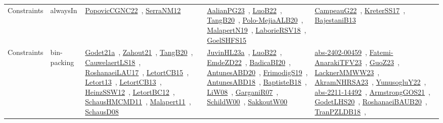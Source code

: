 {\begin{longtable}{lp{3cm}>{\raggedright\arraybackslash}p{6cm}>{\raggedright\arraybackslash}p{6cm}>{\raggedright\arraybackslash}p{8cm}}
Constraints & alwaysIn & \href{../works/PopovicCGNC22.pdf}{PopovicCGNC22}~\cite{PopovicCGNC22}, \href{../works/SerraNM12.pdf}{SerraNM12}~\cite{SerraNM12} & \href{../works/AalianPG23.pdf}{AalianPG23}~\cite{AalianPG23}, \href{../works/LuoB22.pdf}{LuoB22}~\cite{LuoB22}, \href{../works/TangB20.pdf}{TangB20}~\cite{TangB20}, \href{../works/Polo-MejiaALB20.pdf}{Polo-MejiaALB20}~\cite{Polo-MejiaALB20}, \href{../works/MalapertN19.pdf}{MalapertN19}~\cite{MalapertN19}, \href{../works/LaborieRSV18.pdf}{LaborieRSV18}~\cite{LaborieRSV18}, \href{../works/GoelSHFS15.pdf}{GoelSHFS15}~\cite{GoelSHFS15} & \href{../works/CampeauG22.pdf}{CampeauG22}~\cite{CampeauG22}, \href{../works/KreterSS17.pdf}{KreterSS17}~\cite{KreterSS17}, \href{../works/BajestaniB13.pdf}{BajestaniB13}~\cite{BajestaniB13}\\
Constraints & bin-packing & \href{../works/Godet21a.pdf}{Godet21a}~\cite{Godet21a}, \href{../works/Zahout21.pdf}{Zahout21}~\cite{Zahout21}, \href{../works/TangB20.pdf}{TangB20}~\cite{TangB20}, \href{../works/CauwelaertLS18.pdf}{CauwelaertLS18}~\cite{CauwelaertLS18}, \href{../works/RoshanaeiLAU17.pdf}{RoshanaeiLAU17}~\cite{RoshanaeiLAU17}, \href{../works/LetortCB15.pdf}{LetortCB15}~\cite{LetortCB15}, \href{../works/Letort13.pdf}{Letort13}~\cite{Letort13}, \href{../works/LetortCB13.pdf}{LetortCB13}~\cite{LetortCB13}, \href{../works/HeinzSSW12.pdf}{HeinzSSW12}~\cite{HeinzSSW12}, \href{../works/LetortBC12.pdf}{LetortBC12}~\cite{LetortBC12}, \href{../works/SchausHMCMD11.pdf}{SchausHMCMD11}~\cite{SchausHMCMD11}, \href{../works/Malapert11.pdf}{Malapert11}~\cite{Malapert11}, \href{../works/SchausD08.pdf}{SchausD08}~\cite{SchausD08} & \href{../works/JuvinHL23a.pdf}{JuvinHL23a}~\cite{JuvinHL23a}, \href{../works/LuoB22.pdf}{LuoB22}~\cite{LuoB22}, \href{../works/EmdeZD22.pdf}{EmdeZD22}~\cite{EmdeZD22}, \href{../works/BadicaBI20.pdf}{BadicaBI20}~\cite{BadicaBI20}, \href{../works/AntunesABD20.pdf}{AntunesABD20}~\cite{AntunesABD20}, \href{../works/FrimodigS19.pdf}{FrimodigS19}~\cite{FrimodigS19}, \href{../works/AntunesABD18.pdf}{AntunesABD18}~\cite{AntunesABD18}, \href{../works/BaptisteB18.pdf}{BaptisteB18}~\cite{BaptisteB18}, \href{../works/LiW08.pdf}{LiW08}~\cite{LiW08}, \href{../works/GarganiR07.pdf}{GarganiR07}~\cite{GarganiR07}, \href{../works/SchildW00.pdf}{SchildW00}~\cite{SchildW00}, \href{../works/SakkoutW00.pdf}{SakkoutW00}~\cite{SakkoutW00} & \href{../works/abs-2402-00459.pdf}{abs-2402-00459}~\cite{abs-2402-00459}, \href{../works/Fatemi-AnarakiTFV23.pdf}{Fatemi-AnarakiTFV23}~\cite{Fatemi-AnarakiTFV23}, \href{../works/GuoZ23.pdf}{GuoZ23}~\cite{GuoZ23}, \href{../works/LacknerMMWW23.pdf}{LacknerMMWW23}~\cite{LacknerMMWW23}, \href{../works/AkramNHRSA23.pdf}{AkramNHRSA23}~\cite{AkramNHRSA23}, \href{../works/YunusogluY22.pdf}{YunusogluY22}~\cite{YunusogluY22}, \href{../works/abs-2211-14492.pdf}{abs-2211-14492}~\cite{abs-2211-14492}, \href{../works/ArmstrongGOS21.pdf}{ArmstrongGOS21}~\cite{ArmstrongGOS21}, \href{../works/GodetLHS20.pdf}{GodetLHS20}~\cite{GodetLHS20}, \href{../works/RoshanaeiBAUB20.pdf}{RoshanaeiBAUB20}~\cite{RoshanaeiBAUB20}, \href{../works/TranPZLDB18.pdf}{TranPZLDB18}~\cite{TranPZLDB18}, 
\end{longtable}}
